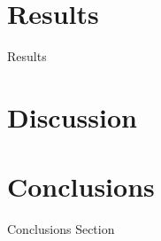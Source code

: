 \documentclass[review, 1p, number, sort&compress,table]{elsarticle}
\begin{document}
	\section{Results}\label{sec:results}
	Results
	\section{Discussion}\label{sec:discussion}
	

	
	
	\section{Conclusions}
	\indent Conclusions Section
	

	      
\end{document}
